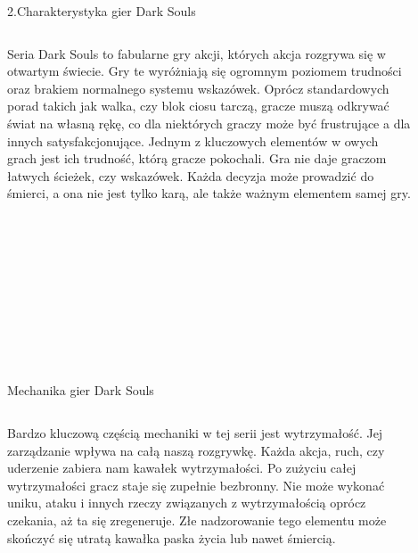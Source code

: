 \documentclass{beamer}
\begin{document}
\begin{frame}{2.Charakterystyka gier \glqq Dark Souls\grqq} %
\begin{columns}
\begin{column}{0.5\textwidth}
\small     Seria  Dark Souls  to fabularne gry akcji, których akcja rozgrywa się w otwartym świecie. Gry te wyróżniają się ogromnym poziomem trudności oraz brakiem normalnego systemu wskazówek. Oprócz standardowych porad takich jak walka, czy blok ciosu tarczą,  gracze muszą odkrywać świat na własną rękę, co dla niektórych graczy może być frustrujące a dla innych satysfakcjonujące. Jednym z kluczowych elementów w owych grach jest ich trudność, którą gracze pokochali. Gra nie daje graczom łatwych ścieżek, czy wskazówek. Każda decyzja może prowadzić do śmierci, a ona nie jest tylko karą, ale także ważnym elementem samej gry.

\end{column}
\begin{column}{0.5\textwidth}
    \begin{figure}
    \centering
        \texttt{[image: You died ds.jpg]}
 
    \end{figure}
\end{column}
\end{columns}

\end{frame}

\begin{frame}{Mechanika gier \glqq Dark Souls\grqq} %
\begin{columns}
\begin{column}{0.5\textwidth}
\small      Bardzo kluczową częścią mechaniki w tej serii jest wytrzymałość. Jej zarządzanie wpływa na całą naszą rozgrywkę. Każda akcja, ruch, czy uderzenie zabiera nam kawałek wytrzymałości. Po zużyciu całej wytrzymałości gracz staje się zupełnie bezbronny. Nie może wykonać uniku, ataku i innych rzeczy związanych z wytrzymałością oprócz czekania, aż ta się zregeneruje. Złe nadzorowanie tego elementu może skończyć się utratą kawałka paska życia lub nawet śmiercią.

\end{column}
\begin{column}{0.5\textwidth}
    \begin{figure}
    \centering
        \texttt{[image: stamina.jpg]}
 
    \end{figure}
\end{column}
\end{columns}

\end{frame}
\end{document}
